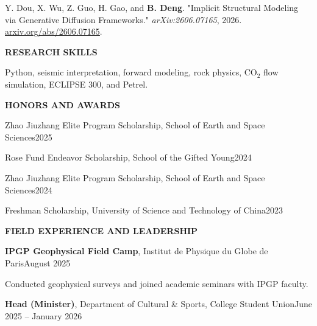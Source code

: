 \documentclass[10pt,letterpaper]{article}
\newcommand{\cvsection}[1]{\vspace{0.85em}\begin{center}\bfseries\MakeUppercase{#1}\end{center}\vspace{-0.7em}}
\newcommand{\cvrole}[2]{#1\hfill #2\par}
\newcommand{\cvlink}[2]{\href{#1}{\underline{#2}}}
\begin{document}
Y. Dou, X. Wu, Z. Guo, H. Gao, and \textbf{B. Deng}. "Implicit Structural Modeling via Generative Diffusion Frameworks." \textit{arXiv:2606.07165}, 2026. \cvlink{https://arxiv.org/abs/2606.07165}{arxiv.org/abs/2606.07165}.
\cvsection{Research Skills}
Python, seismic interpretation, forward modeling, rock physics, CO$_2$ flow simulation, ECLIPSE 300, and Petrel.
\cvsection{Honors and Awards}
\cvrole{Zhao Jiuzhang Elite Program Scholarship, School of Earth and Space Sciences}{2025}
\cvrole{Rose Fund Endeavor Scholarship, School of the Gifted Young}{2024}
\cvrole{Zhao Jiuzhang Elite Program Scholarship, School of Earth and Space Sciences}{2024}
\cvrole{Freshman Scholarship, University of Science and Technology of China}{2023}
\cvsection{Field Experience and Leadership}
\cvrole{\textbf{IPGP Geophysical Field Camp}, Institut de Physique du Globe de Paris}{August 2025}
Conducted geophysical surveys and joined academic seminars with IPGP faculty.\par\vspace{0.3em}
\cvrole{\textbf{Head (Minister)}, Department of Cultural \& Sports, College Student Union}{June 2025 -- January 2026}
\end{document}
